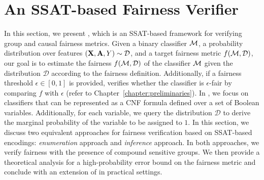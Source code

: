 \section{An SSAT-based Fairness Verifier}
\label{fairness_justicia_sec:framework}
In this section, we present {\justicia}, which is an SSAT-based framework for verifying group and causal fairness metrics. Given a binary classifier $\alg$, a probability distribution over features $(\mathbf{X},\mathbf{A},Y) \sim \mathcal{D} $, and a target fairness metric $ f(\mathcal{M}, \mathcal{D}) $, our goal is to estimate the fairness $ f(\mathcal{M}, \mathcal{D}) $ of the classifier $ \alg $ given the distribution $ \mathcal{D} $ according to the fairness definition. Additionally, if a fairness threshold $ \epsilon \in [0,1] $ is provided, {\justicia} verifies whether the classifier is $ \epsilon $-fair by comparing $ f $ with $ \epsilon $ (refer to Chapter~\ref{chapter:preliminaries}). In {\justicia}, we focus on classifiers that can be represented as a CNF formula defined over a set of Boolean variables. Additionally, for each variable, we query the distribution $ \mathcal{D} $ to derive the marginal probability of the variable to be assigned to $ 1 $. In this section, we discuss two equivalent approaches for fairness verification based on SSAT-based encodings: \emph{enumeration} approach and \emph{inference} approach. In both approaches, we verify fairness with the presence of compound sensitive groups.  We then provide a theoretical analysis for a high-probability error bound on the fairness metric and conclude with an extension of {\justicia} in practical settings.




\iffalse
In this section, we present the main contribution of this paper, {\justicia}, which is an SSAT framework for verifying independence and separation metrics of fairness. 
We first state the problem formally in Section~\ref{fairness_justicia_sec:problem_statement}. 
To verify fairness metrics in compound sensitive groups, we discuss an enumeration approach in Section~\ref{fairness_justicia_sec:enumeration_ssat} and an equivalent but more efficient learning approach in Section~\ref{fairness_justicia_sec:learn_ssat}. 
We conclude this section by proposing a conditional distribution based enumeration for compound sensitive groups in Section~\ref{fairness_justicia_sec:cond_ssat}. 


\subsection{Problem Statement}
\label{fairness_justicia_sec:problem_statement}
Given a binary classifier $\alg$ and a probability distribution over dataset $(X,A,Y) \sim \mathcal{D} $, our goal is to verify whether $\alg$ achieves independence and separation metrics with respect to the distribution $\mathcal{D}$. We  focus on a classifier that can be translated to a CNF formula of Boolean variables $\mathbf{B} $. 
The probability $ p_i $ of $\bool_i \in \mathbf{B}$ being assigned to $1$ is induced by the data generating distribution $\mathcal{D}$. 
In our contribution, we reduce the verification problem to solving appropriately designed SSAT instances.
\fi 

